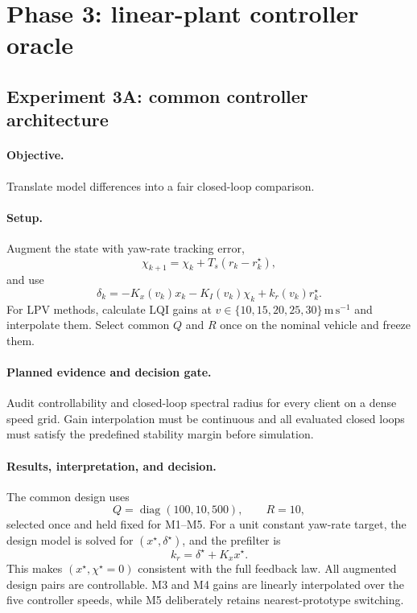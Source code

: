\section{Phase 3: linear-plant controller oracle}
\label{sec:phase3}

\subsection{Experiment 3A: common controller architecture}
\paragraph{Objective.}
Translate model differences into a fair closed-loop comparison.

\paragraph{Setup.}
Augment the state with yaw-rate tracking error,
\begin{equation}
 \chi_{k+1}=\chi_k+T_s(r_k-r_k^\star),
\end{equation}
and use
\begin{equation}
 \delta_k=-K_x(v_k)x_k-K_I(v_k)\chi_k+k_r(v_k)r_k^\star.
\end{equation}
For LPV methods, calculate LQI gains at
$v\in\{10,15,20,25,30\}\,\mathrm{m\,s^{-1}}$ and interpolate them. Select common
$Q$ and $R$ once on the nominal vehicle and freeze them.

\paragraph{Planned evidence and decision gate.}
Audit controllability and closed-loop spectral radius for every client on a dense
speed grid. Gain interpolation must be continuous and all evaluated closed loops
must satisfy the predefined stability margin before simulation.

\paragraph{Results, interpretation, and decision.}
The common design uses
\begin{equation}
 Q=\operatorname{diag}(100,10,500),\qquad R=10,
\end{equation}
selected once and held fixed for M1--M5.  For a unit constant yaw-rate target,
the design model is solved for $(x^\star,\delta^\star)$, and the prefilter is
\begin{equation}
 k_r=\delta^\star+K_xx^\star.
\end{equation}
This makes $(x^\star,\chi^\star=0)$ consistent with the full feedback law.  All
augmented design pairs are controllable.  M3 and M4 gains are linearly
interpolated over the five controller speeds, while M5 deliberately retains
nearest-prototype switching.

